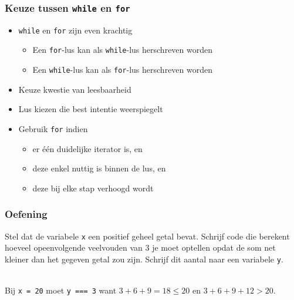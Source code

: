 \documentclass{../khlslides}
\begin{document}
\begin{frame}
  \frametitle{Keuze tussen {\tt while} en {\tt for}}
  \begin{itemize}
    \item {\tt while} en {\tt for} zijn even krachtig
          \begin{itemize}
            \item Een {\tt for}-lus kan als {\tt while}-lus herschreven worden
            \item Een {\tt while}-lus kan als {\tt for}-lus herschreven worden
          \end{itemize}
    \item Keuze kwestie van leesbaarheid
    \item Lus kiezen die best intentie weerspiegelt
    \item Gebruik {\tt for} indien
          \begin{itemize}
            \item er \'e\'en duidelijke iterator is, en
            \item deze enkel nuttig is binnen de lus, en
            \item deze bij elke stap verhoogd wordt
          \end{itemize}
  \end{itemize}
\end{frame}

\begin{frame}
  \frametitle{Oefening}
  Stel dat de variabele {\tt x} een positief geheel getal bevat. Schrijf code die berekent hoeveel opeenvolgende veelvouden van 3 je moet optellen
  opdat de som net kleiner dan het gegeven getal zou zijn. Schrijf dit aantal naar een variabele {\tt y}.

  \vskip5mm

   \\
  Bij {\tt x = 20} moet {\tt y === 3} want $3+6+9 = 18 \leq 20$ en $3+6+9+12 > 20$.
\end{frame}
\end{document}
